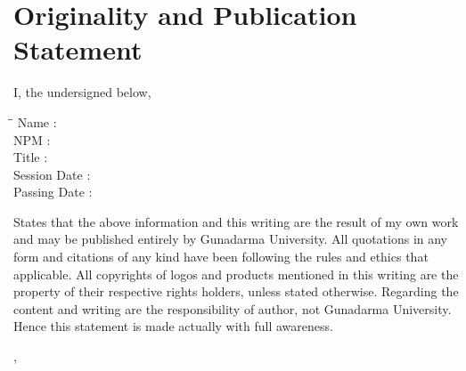 
\begingroup
\let\clearpage\relax
\let\cleardoublepage\relax

\chapter*{Originality and Publication Statement}
\label{chap:sig-statement}

I, the undersigned below,

\begin{tabbing}
\hspace*{3cm}\=\hspace*{0.5cm}\= \kill
Name \>:\> \myName \\
NPM \>:\> \myNPM \\
Title \>:\> \myDepTitle \\
Session Date \>:\> \myDateSession \\
Passing Date \>:\> \myDatePassing
\end{tabbing}

States that the above information and this writing are the result of my own work and may be published entirely by Gunadarma University.
All quotations in any form and citations of any kind have been following the rules and ethics that applicable.
All copyrights of logos and products mentioned in this writing are the property of their respective rights holders, unless stated otherwise.
Regarding the content and writing are the responsibility of author, not Gunadarma University.
Hence this statement is made actually with full awareness.

\hfill

\begin{flushright}
\myCity, \myTime
\end{flushright}

\hfill

\begin{flushright}
\myName
\end{flushright}

\endgroup
